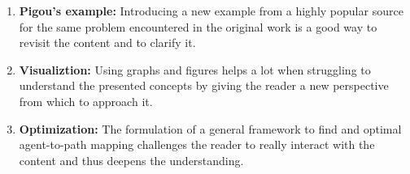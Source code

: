 \documentclass[../review.tex]{subfiles}
\begin{document}
 \textcolor{green}{\Large\checkmark}
\begin{enumerate}
 \item \textbf{Pigou's example:} Introducing a new example from a highly popular source for the same problem encountered in the original work is a good way to revisit the content and to clarify it.
 \item \textbf{Visualiztion:} Using graphs and figures helps a lot when struggling to understand the presented concepts by giving the reader a new perspective from which to approach it.
 \item \textbf{Optimization:} The formulation of a general framework to find and optimal agent-to-path mapping challenges the reader to really interact with the content and thus deepens the understanding.
\end{enumerate}
\end{document}
